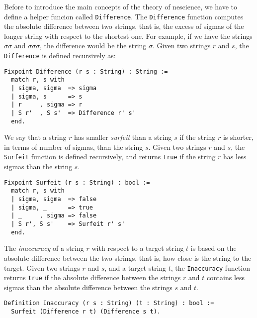 Before to introduce the main concepts of the theory of nescience, we have to define a helper funcion called \texttt{Difference}. The \texttt{Difference} function computes the absolute difference between two strings, that is, the excess of sigmas of the longer string with respect to the shortest one. For example, if we have the strings $\sigma \sigma$ and $\sigma \sigma \sigma$, the difference would be the string $\sigma$. Given two strings $r$ and $s$, the \texttt{Difference} is defined recursively as:

\begin{sourcecode}
{\scriptsize \begin{verbatim}
Fixpoint Difference (r s : String) : String :=
  match r, s with
  | sigma, sigma  => sigma
  | sigma, s      => s
  | r     , sigma => r
  | S r'  , S s'  => Difference r' s'
  end.
\end{verbatim}}
\end{sourcecode}

We say that a string $r$ has smaller \emph{surfeit} than a string $s$ if the string $r$ is shorter, in terms of number of sigmas, than the string $s$. Given two strings $r$ and $s$, the \texttt{Surfeit} function is defined recursively, and returns \texttt{true} if the string $r$ has less sigmas than the string $s$. 

\begin{sourcecode}
{\scriptsize \begin{verbatim}
Fixpoint Surfeit (r s : String) : bool :=
  match r, s with
  | sigma, sigma  => false
  | sigma, _      => true
  | _     , sigma => false
  | S r', S s'    => Surfeit r' s' 
  end.
\end{verbatim}}
\end{sourcecode}

The \emph{inaccuracy} of a string $r$ with respect to a target string $t$ is based on the absolute difference between the two strings, that is, how close is the string to the target. Given two strings $r$ and $s$, and a target string $t$, the \texttt{Inaccuracy} function returns \texttt{true} if the absolute difference between the strings $r$ and $t$ contains less sigmas than the absolute difference between the strings $s$ and $t$.

\begin{sourcecode}
{\scriptsize \begin{verbatim}
Definition Inaccuracy (r s : String) (t : String) : bool :=
  Surfeit (Difference r t) (Difference s t).\end{verbatim}}
\end{sourcecode}


